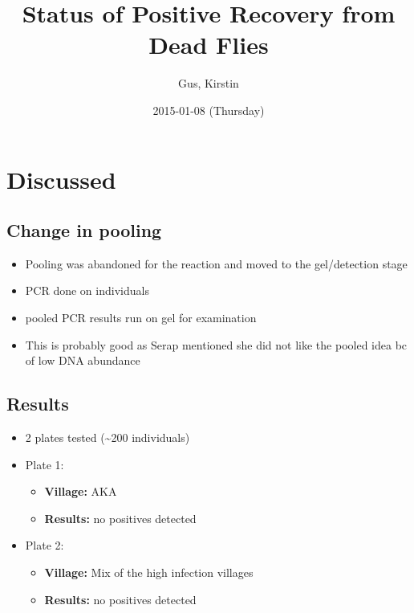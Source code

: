 \documentclass[letterpaper]{scrartcl}
\title{Status of Positive Recovery from Dead Flies}
\author{Gus, Kirstin}
\date{2015-01-08 (Thursday)}
\begin{document}
\maketitle

{
\hypersetup{linkcolor=black}
\setcounter{tocdepth}{3}
\tableofcontents
}
\section{Discussed}\label{discussed}

\subsection{Change in pooling}\label{change-in-pooling}

\begin{itemize}
\itemsep1pt\parskip0pt
\item
  Pooling was abandoned for the reaction and moved to the gel/detection
  stage
\item
  PCR done on individuals
\item
  pooled PCR results run on gel for examination
\item
  This is probably good as Serap mentioned she did not like the pooled
  idea bc of low DNA abundance
\end{itemize}

\subsection{Results}\label{results}

\begin{itemize}
\itemsep1pt\parskip0pt
\item
  2 plates tested (\textasciitilde{}200 individuals)
\item
  Plate 1:

  \begin{itemize}
  \itemsep1pt\parskip0pt
  \item
    \textbf{Village:} AKA
  \item
    \textbf{Results:} no positives detected
  \end{itemize}
\item
  Plate 2:

  \begin{itemize}
  \itemsep1pt\parskip0pt
  \item
    \textbf{Village:} Mix of the high infection villages
  \item
    \textbf{Results:} no positives detected
  \end{itemize}
\end{itemize}
\end{document}
